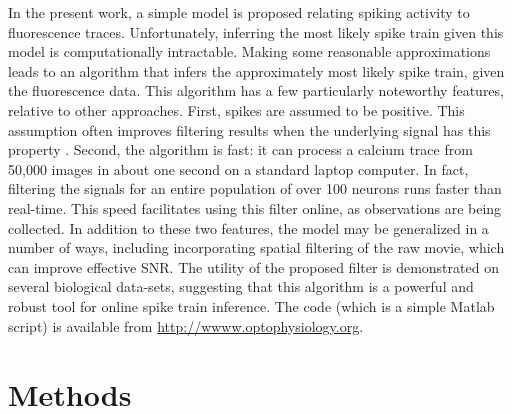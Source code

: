 In the present work, a simple model is proposed relating spiking activity to fluorescence traces. Unfortunately, inferring the most likely spike train given this model is computationally intractable.  Making some reasonable approximations leads to an algorithm that infers the approximately most likely spike train, given the fluorescence data.  This algorithm has a few particularly noteworthy features, relative to other approaches.  First, spikes are assumed to be positive.  This assumption often improves filtering results when the underlying signal has this property \cite{PortugalVicente94, MarkhamConchello99, LeeSeung99, LLS04, OGradyPearlmutter06, HuysPaninski06, Cunningham08, PaninskiWu09}.  Second, the algorithm is fast: it can process a calcium trace from 50,000 images in about one second on a standard laptop computer. In fact, filtering the signals for an entire population of over 100 neurons runs faster than real-time. This speed facilitates using this filter online, as observations are being collected. In addition to these two features, the model may be generalized in a number of ways, including incorporating spatial filtering of the raw movie, which can improve effective SNR. The utility of the proposed filter is demonstrated on several biological data-sets, suggesting that this algorithm is a powerful and robust tool for online spike train inference.  The code (which is a simple Matlab script) is available from \url{http://wwww.optophysiology.org}.







\section{Methods} \label{sec:methods}




